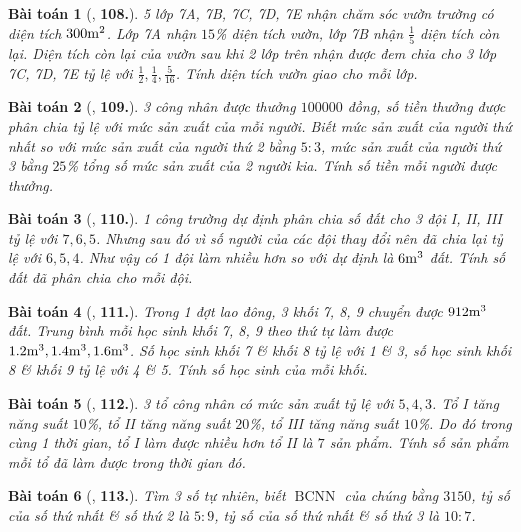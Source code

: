\documentclass{article}
\numberwithin{equation}{section}
\newtheorem{baitoan}{Bài toán}
\begin{document}
\begin{baitoan}[\cite{Binh_Toan_7_tap_1}, \textbf{108.}]
	5 lớp 7A, 7B, 7C, 7D, 7E nhận chăm sóc vườn trường có diện tích $300\rm m^2$. Lớp 7A nhận $15$\% diện tích vườn, lớp 7B nhận $\frac{1}{5}$ diện tích còn lại. Diện tích còn lại của vườn sau khi 2 lớp trên nhận được đem chia cho 3 lớp 7C, 7D, 7E tỷ lệ với $\frac{1}{2},\frac{1}{4},\frac{5}{16}$. Tính diện tích vườn giao cho mỗi lớp.
\end{baitoan}

\begin{baitoan}[\cite{Binh_Toan_7_tap_1}, \textbf{109.}]
	3 công nhân được thưởng $100000$ đồng, số tiền thưởng được phân chia tỷ lệ với mức sản xuất của mỗi người. Biết mức sản xuất của người thứ nhất so với mức sản xuất của người thứ 2 bằng $5:3$, mức sản xuất của người thứ 3 bằng $25$\% tổng số mức sản xuất của 2 người kia. Tính số tiền mỗi người được thưởng.
\end{baitoan}

\begin{baitoan}[\cite{Binh_Toan_7_tap_1}, \textbf{110.}]
	1 công trường dự định phân chia số đất cho 3 đội I, II, III tỷ lệ với $7,6,5$. Nhưng sau đó vì số người của các đội thay đổi nên đã chia lại tỷ lệ với $6,5,4$. Như vậy có 1 đội làm nhiều hơn so với dự định là $\rm6m^3$ đất. Tính số đất đã phân chia cho mỗi đội.
\end{baitoan}

\begin{baitoan}[\cite{Binh_Toan_7_tap_1}, \textbf{111.}]
	Trong 1 đợt lao đông, 3 khối 7, 8, 9 chuyển được $\rm912m^3$ đất. Trung bình mỗi học sinh khối 7, 8, 9 theo thứ tự làm được $\rm1.2m^3,1.4m^3,1.6m^3$. Số học sinh khối 7 \& khối 8 tỷ lệ với 1 \& 3, số học sinh khối 8 \& khối 9 tỷ lệ với 4 \& 5. Tính số học sinh của mỗi khối.
\end{baitoan}

\begin{baitoan}[\cite{Binh_Toan_7_tap_1}, \textbf{112.}]
	3 tổ công nhân có mức sản xuất tỷ lệ với $5,4,3$. Tổ I tăng năng suất $10$\%, tổ II tăng năng suất $20$\%, tổ III tăng năng suất $10$\%. Do đó trong cùng 1 thời gian, tổ I làm được nhiều hơn tổ II là $7$ sản phẩm. Tính số sản phẩm mỗi tổ đã làm được trong thời gian đó.
\end{baitoan}

\begin{baitoan}[\cite{Binh_Toan_7_tap_1}, \textbf{113.}]
	Tìm 3 số tự nhiên, biết $\operatorname{BCNN}$ của chúng bằng $3150$, tỷ số của số thứ nhất \& số thứ 2 là $5:9$, tỷ số của số thứ nhất \& số thứ 3 là $10:7$.
\end{baitoan}
\end{document}
